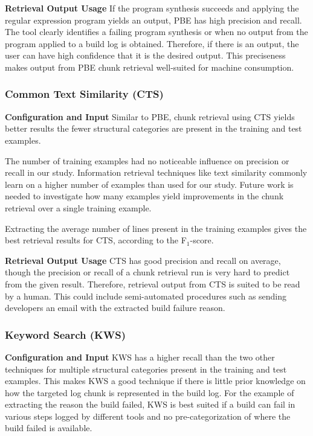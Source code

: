 \noindent
\textbf{Retrieval Output Usage}
If the program synthesis succeeds and applying the regular expression
program yields an output, PBE has high precision and recall. The tool
clearly identifies a failing program synthesis or when no output from
the program applied to a build log is obtained. Therefore, if there is
an output, the user can have high confidence that it is the desired
output. This preciseness makes output from PBE chunk retrieval
well-suited for machine consumption.

\subsubsection{Common Text Similarity (CTS)}
\noindent
\textbf{Configuration and Input}
Similar to PBE, chunk retrieval using CTS yields better results the
fewer structural categories are present in the training and test
examples.

The number of training examples had no noticeable influence on
precision or recall in our study. Information retrieval techniques
like text similarity commonly learn on a higher number of examples
than used for our study. Future work is needed to investigate how many
examples yield improvements in the chunk retrieval over a single
training example.

Extracting the average number of lines present in the training
examples gives the best retrieval results for CTS, according to the
F$_{1}$-score.

\noindent
\textbf{Retrieval Output Usage}
CTS has good precision and recall on average, though the precision or
recall of a chunk retrieval run is very hard to predict from the given
result. Therefore, retrieval output from CTS is suited to be read by a
human. This could include semi-automated procedures such as sending
developers an email with the extracted build failure reason.

\subsubsection{Keyword Search (KWS)}
\noindent
\textbf{Configuration and Input}
KWS has a higher recall than the two other techniques for multiple
structural categories present in the training and test examples. This
makes KWS a good technique if there is little prior knowledge on how
the targeted log chunk is represented in the build log. For the
example of extracting the reason the build failed, KWS is best suited
if a build can fail in various steps logged by different tools and no
pre-categorization of where the build failed is available.

